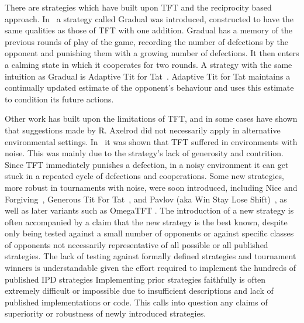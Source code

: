 \documentclass{article}
\begin{document}
There are strategies which have built upon TFT and the reciprocity based approach.
In~\cite{Beaufils1997} a strategy called Gradual was introduced, constructed to have the
same qualities as those of TFT with one addition. Gradual has a memory
of the previous rounds of play of the game, recording the number of defections
by the opponent and punishing them with a growing number of defections. It
then enters a calming state in which it cooperates for two rounds. A
strategy with the same intuition as Gradual is Adaptive Tit for
Tat~\cite{tzafestas-2000a}. Adaptive Tit for Tat maintains a continually updated estimate of the
opponent's behaviour and uses this estimate to condition its future actions.

Other work has built upon the limitations of TFT, and in some cases have shown
that suggestions made by R. Axelrod did not necessarily apply in alternative environmental settings.
In~\cite{Bendor1991, Donninger1986, Molander1985, Hammerstein1984} it was shown
that TFT suffered in environments with noise. This was
mainly due to the strategy's lack of generosity and contrition. Since TFT immediately
punishes a defection, in a noisy environment it can get stuck in a
repeated cycle of defections and cooperations. Some new strategies, more
robust in tournaments with noise, were soon introduced, including
Nice and Forgiving~\cite{Bendor1991}, Generous Tit For Tat~\cite{Nowak1992},
and Pavlov (aka Win Stay Lose Shift)~\cite{Nowak1993}, as well as later
variants such as OmegaTFT \cite{kendall2007iterated}. The introduction of a new strategy
is often accompanied by a claim that the new strategy is the best known, despite
only being tested against a small number of opponents or against specific classes of
opponents not necessarily representative of all possible or all published strategies.
The lack of testing against formally defined strategies and tournament winners
is understandable given the effort required to implement the hundreds of published IPD strategies
Implementing prior strategies faithfully is often extremely difficult or
impossible due to insufficient descriptions and lack of published
implementations or code.
This calls into question any claims of superiority or robustness of newly introduced strategies.
\end{document}
